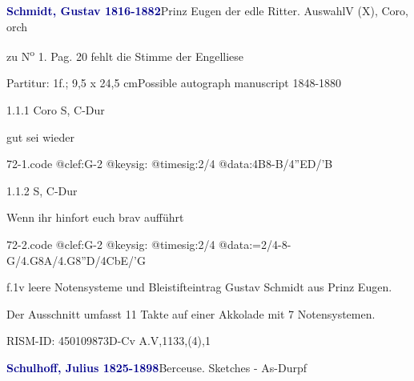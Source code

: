 \documentclass[a4paper, twocolumn, 11pt]{book}
\begin{document}
\par \vspace{16pt} \textcolor{darkblue}{\textbf{Schmidt, Gustav  1816-1882}}\hfillplus{[72]}\newline Prinz Eugen der edle Ritter. Auswahl\newline V (X), Coro, orch
\par \begin{itshape} zu N\textsuperscript{o} 1. Pag. 20 fehlt die Stimme der Engelliese\end{itshape} 
\par \textcolor{darkblue}{}  Partitur: 1f.; 9,5 x 24,5 cm\newline Possible autograph manuscript  1848-1880
\par 1.1.1  Coro S, C-Dur\newline \begin{footnotesize} [...] gut sei wieder \end{footnotesize}  
\begin{filecontents*}{72-1.code}
@clef:G-2
@keysig:
@timesig:2/4
@data:4B8-B/4''ED/'B
\end{filecontents*}
\newline %
\par 1.1.2  S, C-Dur\newline \begin{footnotesize} Wenn ihr hinfort euch brav aufführt \end{footnotesize}  
\begin{filecontents*}{72-2.code}
@clef:G-2
@keysig:
@timesig:2/4
@data:=2/4-8-G/4.G8A/4.G8''D/4CbE/'G
\end{filecontents*}
\newline %
\par f.1v leere Notensysteme und Bleistifteintrag {\textquotedbl}Gustav Schmidt aus Prinz Eugen.{\textquotedbl}
\par Der Ausschnitt umfasst 11 Takte auf einer Akkolade mit 7 Notensystemen.
\par RISM-ID: 450109873\newline D-Cv  A.V,1133,(4),1
\par \vspace{16pt} \textcolor{darkblue}{\textbf{Schulhoff, Julius  1825-1898}}\hfillplus{[73]}\newline Berceuse. Sketches - As-Dur\newline pf
\end{document}
